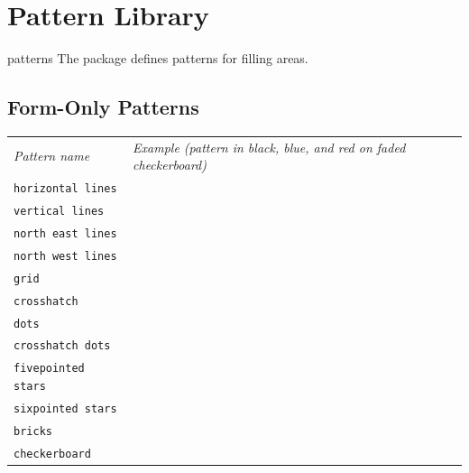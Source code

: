 %
%
%


\section{Pattern Library}
\label{section-library-patterns}

\begin{pgflibrary}{patterns}
    The package defines patterns for filling areas.
\end{pgflibrary}


\newcommand\patternindex[1]{%
  \index{#1@\protect\texttt{#1} pattern}%
  \index{Patterns!#1@\protect\texttt{#1}}%
  \texttt{#1}&
  \begin{tikzpicture}[baseline=.5ex]

    \pattern [path fading=west,pattern=checkerboard light gray]
      (0,0) rectangle (5cm,2em);

    \pattern [pattern=#1,pattern color=black] (0,0)    rectangle +(1.5cm,2em);
    \pattern [pattern=#1,pattern color=blue]  (1.75,0) rectangle +(1.5cm,2em);
    \pattern [pattern=#1,pattern color=red]   (3.5,0)  rectangle +(1.5cm,2em);
  \end{tikzpicture} \\[1ex]
}

\newcommand\patternindexinherentlycolored[1]{%
  \index{#1@\protect\texttt{#1} pattern}%
  \index{Patterns!#1@\protect\texttt{#1}}%
  \texttt{#1}&
  \begin{tikzpicture}[baseline=.5ex]

    \pattern [path fading=west,pattern=checkerboard light gray]
      (0,0) rectangle (5cm,2em);

    \pattern [pattern=#1,pattern color=blue] (0,0) rectangle +(5cm,2em);
  \end{tikzpicture} \\[1ex]
}


\subsection{Form-Only Patterns}

\begin{tabular}{ll}
    \emph{Pattern name}
        & \emph{Example (pattern in black, blue, and red on faded checkerboard)} \\
    \patternindex{horizontal lines}
    \patternindex{vertical lines}
    \patternindex{north east lines}
    \patternindex{north west lines}
    \patternindex{grid}
    \patternindex{crosshatch}
    \patternindex{dots}
    \patternindex{crosshatch dots}
    \patternindex{fivepointed stars}
    \patternindex{sixpointed stars}
    \patternindex{bricks}
    \patternindex{checkerboard}
\end{tabular}


